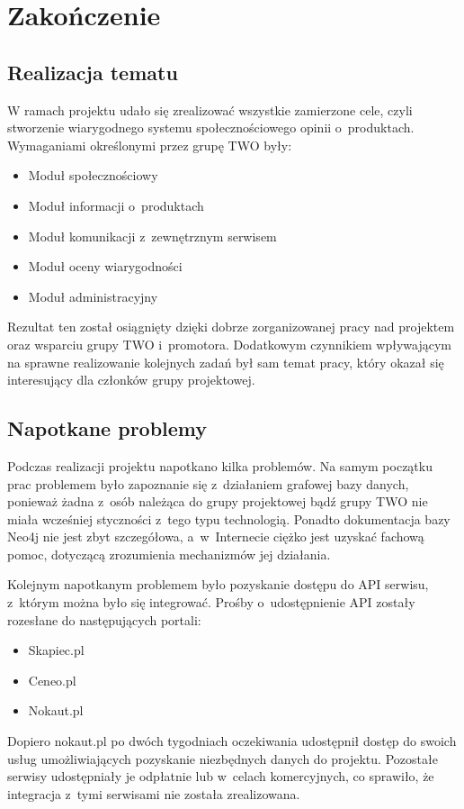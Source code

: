 \chapter{Zakończenie}

\section{Realizacja tematu}

W ramach projektu udało się zrealizować wszystkie zamierzone cele, czyli stworzenie wiarygodnego systemu społecznościowego opinii o~produktach. Wymaganiami określonymi przez grupę TWO były:
\begin{itemize}
\item Moduł społecznościowy
\item Moduł informacji o~produktach
\item Moduł komunikacji z~zewnętrznym serwisem
\item Moduł oceny wiarygodności
\item Moduł administracyjny
\end{itemize}
Rezultat ten został osiągnięty dzięki dobrze zorganizowanej pracy nad projektem oraz wsparciu grupy TWO i~promotora. Dodatkowym czynnikiem wpływającym na sprawne realizowanie kolejnych zadań był sam temat pracy, który okazał się interesujący dla członków grupy projektowej.

\section{Napotkane problemy}

Podczas realizacji projektu napotkano kilka problemów. Na samym początku prac problemem było zapoznanie się z~działaniem grafowej bazy danych, ponieważ żadna z~osób należąca do grupy projektowej bądź grupy TWO nie miała wcześniej styczności z~tego typu technologią. Ponadto dokumentacja bazy Neo4j nie jest zbyt szczegółowa, a~w~Internecie ciężko jest uzyskać fachową pomoc, dotyczącą zrozumienia mechanizmów jej działania.

Kolejnym napotkanym problemem było pozyskanie dostępu do API serwisu, z~którym można było się integrować. Prośby o~udostępnienie API zostały rozesłane do następujących portali:
\begin{itemize}
\item Skapiec.pl
\item Ceneo.pl
\item Nokaut.pl
\end{itemize}
Dopiero nokaut.pl po dwóch tygodniach oczekiwania udostępnił dostęp do swoich usług umożliwiających pozyskanie niezbędnych danych do projektu. Pozostałe serwisy udostępniały je odpłatnie lub w~celach komercyjnych, co sprawiło, że integracja z~tymi serwisami nie została zrealizowana.

